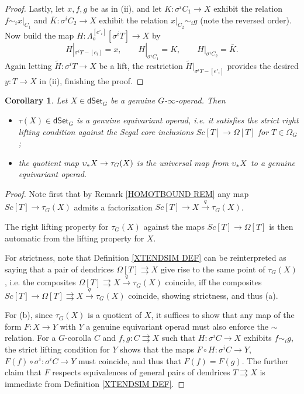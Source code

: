 \documentclass[a4paper,10pt
,draft
]{article}%
\numberwithin{equation}{section}
\numberwithin{figure}{section}
\newtheorem{corollary}[equation]{Corollary}%
\theoremstyle{definition} %
\newcommand{\1}{\ensuremath{\mathbbm 1}}%
\begin{document}
\begin{proof}
Lastly, let $x,f,g$ be as in (ii), 
and let
$K \colon \sigma^i C_1 \to X$ exhibit the relation
$f \sim_i x|_{C_1}$
and 
$ \bar{K} \colon \sigma^i C_2 \to X$
exhibit the relation
$x|_{C_2} \sim_i g$ (note the reversed order).
Now build the map
$H \colon \Lambda_o^{[e'_i]}[\sigma^i T] \to X$ by
\[
	H|_{\sigma^i T - [e_i]} = x,
\qquad
	H|_{\sigma^i C_1} = K,
\qquad
	H|_{\sigma^i C_2} = \bar{K}.
\]
Again letting 
$\widetilde{H} \colon \sigma^i T \to X$ be a lift,
the restriction 
$\widetilde{H}|_{\sigma^i T - [e'_i]}$
provides the desired $y \colon T \to X$ in (ii),
finishing the proof.
\end{proof}


\begin{corollary}\label{HOOPUNIV COR}
Let $X \in \mathsf{dSet}_G$ be a genuine $G$-$\infty$-operad. Then
	\begin{itemize}
	\item[(a)] $\tau(X) \in \mathsf{dSet}_G$ is a genuine equivariant operad, i.e. it satisfies the strict right lifting condition against the Segal core inclusions
	$Sc[T] \to \Omega[T]$ for $T \in \Omega_G$;
	\item[(b)] the quotient map
	$\upsilon_{\**}X \to \tau_G(X)$ is the universal map from $\upsilon_{\**}X$ to a genuine equivariant operad.
	\end{itemize}
\end{corollary}

\begin{proof}
	Note first that by Remark \ref{HOMOTBOUND REM}
	any map $Sc[T] \to \tau_G(X)$ admits a factorization 
	$Sc[T] \to X \xrightarrow{q} \tau_G(X)$.
	
	The right lifting property for $\tau_G(X)$
	against the maps $Sc[T] \to \Omega[T]$
	is then automatic from the lifting property for $X$.

	For strictness,	
	note that Definition \ref{XTENDSIM DEF}
	can be reinterpreted as saying that
	a pair of dendrices $\Omega[T] \rightrightarrows X$
	give rise to the same point of 
	$\tau_G(X)$, i.e. 
	the composites 
	$\Omega[T] \rightrightarrows X \xrightarrow{q}
	\tau_G(X)$ coincide, 
	iff the composites 
	$Sc[T] \to \Omega[T] \rightrightarrows X \xrightarrow{q}
	\tau_G(X)$ coincide, showing strictness, and thus (a).
		
	For (b), since $\tau_G(X)$ is a quotient of
	$X$, it suffices to show that any map
	of the form $F \colon X \to Y$ with $Y$ a genuine equivariant operad must also enforce the $\sim$ relation.
	For a $G$-corolla $C$ and
	$f,g\colon C \rightrightarrows X$ such that 
	$H \colon \sigma^i C \to X$ exhibits
	$f \sim_i g$, 
	the strict lifting condition for $Y$
	shows that the maps
	$F\circ H \colon \sigma^i C \to Y$,
	$F(f) \circ \sigma^i \colon \sigma^i C \to Y$
	must coincide, and thus that
	$F(f)=F(g)$.
	The further claim that $F$ respects equivalences
	of general pairs of dendrices $T \rightrightarrows X$
	is immediate from Definition \ref{XTENDSIM DEF}.
\end{proof}
\end{document}

